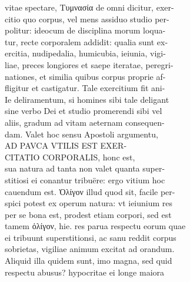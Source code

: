 \documentclass{article}
\begin{document}
\begin{pages}
                vitae spectare, Τυμνασία de omni dicitur, exer- \\
                citio quo corpus, vel mens assiduo studio per- \\
                politur: ideocum de disciplina morum loqua- \\
                tur, recte corporalem addidit: qualia sunt ex- \\
                ercitia, nudipedalia, humicubia, ieiunia, vigi- \\
                liae, preces longiores et saepe iteratae, peregri- \\
                nationes, et similia quibus corpus proprie af- \\
                fligitur et castigatur. Tale exercitium fit ani- \\
                Ie deliramentum, si homines sibi tale deligant \\
                sine verbo Dei et studio promerendi sibi vel \\
                aliis, gradum ad vitam aeternam consequen- \\
                dam. Valet hoc sensu Apostoli argumentu, \\
                AD PAVCA VTILIS EST EXER- \\
                CITATIO CORPORALIS, honc est, \\
                sua natura ad tanta non valet quanta super- \\
                stitiosi ei conantur tribuëre: ergo vitium hoc \\
                cauendum est. Ὀλίγον illud quod sit, facile per- \\
                spici potest ex operum natura: vt ieiunium res \\
                per se bona est, prodest etiam corpori, sed est \\
                tamem ὀλίγον, hie. res parua respectu eorum quae \\
                ei tribuunt superstitionsi, ac sanu reddit corpus \\
                sobrietas, vigiliae animum excitat ad orandum. \\
                Aliquid illa quidem sunt, imo magna, sed quid \\
                respectu abusus? hypocritae ei longe maiora \\

\end{pages}
\end{document}
